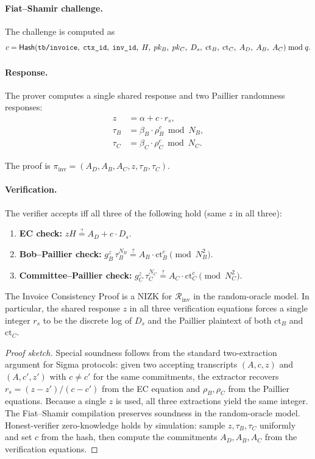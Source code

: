 \paragraph{Fiat--Shamir challenge.} The challenge is computed as
$$
c = \mathsf{Hash}\!\left(\texttt{tb/invoice},\; \texttt{ctx\_id},\; \texttt{inv\_id},\; H,\; pk_B,\; pk_C,\; D_s,\; \mathrm{ct}_B,\; \mathrm{ct}_C,\; A_D,\; A_B,\; A_C\right) \bmod q.
$$

\paragraph{Response.} The prover computes a single shared response and two Paillier randomness responses:
\begin{align*}
z &= \alpha + c \cdot r_s, \\
\tau_B &= \beta_B \cdot \rho_B^c \bmod N_B, \\
\tau_C &= \beta_C \cdot \rho_C^c \bmod N_C.
\end{align*}

The proof is $\pi_{\mathrm{inv}} = (A_D, A_B, A_C, z, \tau_B, \tau_C)$.

\paragraph{Verification.} The verifier accepts iff all three of the following hold (same $z$ in all three):
\begin{enumerate}
  \item \textbf{EC check:}
  $
  z H \stackrel{?}{=} A_D + c \cdot D_s.
  $
  \item \textbf{Bob--Paillier check:}
  $
  g_B^{z}\, \tau_B^{N_B} \stackrel{?}{=} A_B \cdot \mathrm{ct}_B^{c} \pmod{N_B^2}.
  $
  \item \textbf{Committee--Paillier check:}
  $
  g_C^{z}\, \tau_C^{N_C} \stackrel{?}{=} A_C \cdot \mathrm{ct}_C^{c} \pmod{N_C^2}.
  $
\end{enumerate}

\begin{theorem}\label{thm:proof1-sound}
The Invoice Consistency Proof is a NIZK for $\mathcal{R}_{\mathrm{inv}}$ in the random-oracle model. In particular, the shared response $z$ in all three verification equations forces a single integer $r_s$ to be the discrete log of $D_s$ and the Paillier plaintext of both $\mathrm{ct}_B$ and $\mathrm{ct}_C$.
\end{theorem}

\begin{proof}[Proof sketch]
Special soundness follows from the standard two-extraction argument for Sigma protocols: given two accepting transcripts $(A, c, z)$ and $(A, c', z')$ with $c \neq c'$ for the same commitments, the extractor recovers $r_s = (z - z')/(c - c')$ from the EC equation and $\rho_B, \rho_C$ from the Paillier equations. Because a single $z$ is used, all three extractions yield the same integer. The Fiat--Shamir compilation preserves soundness in the random-oracle model. Honest-verifier zero-knowledge holds by simulation: sample $z, \tau_B, \tau_C$ uniformly and set $c$ from the hash, then compute the commitments $A_D, A_B, A_C$ from the verification equations.
\end{proof}



